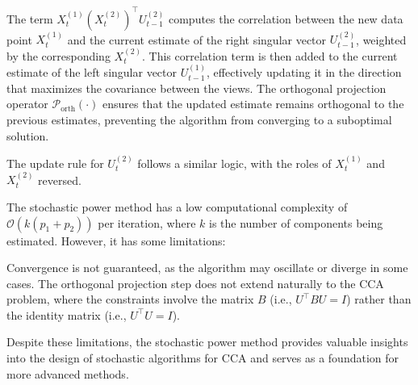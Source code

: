 The term $X_t^{(1)} (X_t^{(2)})^\top U^{(2)}_{t-1}$ computes the correlation between the new data point $X_t^{(1)}$ and the current estimate of the right singular vector $U^{(2)}_{t-1}$, weighted by the corresponding $X_t^{(2)}$.
This correlation term is then added to the current estimate of the left singular vector $U^{(1)}_{t-1}$, effectively updating it in the direction that maximizes the covariance between the views.
The orthogonal projection operator $\mathcal{P}_{\text{orth}}(\cdot)$ ensures that the updated estimate remains orthogonal to the previous estimates, preventing the algorithm from converging to a suboptimal solution.

The update rule for $U^{(2)}_t$ follows a similar logic, with the roles of $X_t^{(1)}$ and $X_t^{(2)}$ reversed.

The stochastic power method has a low computational complexity of $\mathcal{O}(k(p_1+ p_2))$ per iteration, where $k$ is the number of components being estimated. However, it has some limitations:

Convergence is not guaranteed, as the algorithm may oscillate or diverge in some cases.
The orthogonal projection step does not extend naturally to the CCA problem, where the constraints involve the matrix $B$ (i.e., $U^\top B U = I$) rather than the identity matrix (i.e., $U^\top U = I$).

Despite these limitations, the stochastic power method provides valuable insights into the design of stochastic algorithms for CCA and serves as a foundation for more advanced methods.
